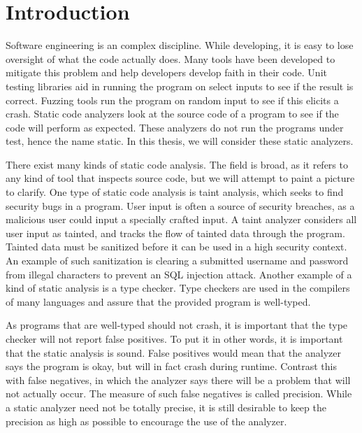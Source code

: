 \chapter{Introduction}
Software engineering is an complex discipline. While developing, it
is easy to lose oversight of what the code actually does. 
Many tools have been developed to mitigate this problem and help developers
develop faith in their code.
Unit testing libraries aid in running the program on select inputs to see 
if the result is correct. Fuzzing tools run the
program on random input to see if this elicits a crash. 
Static code analyzers look at the source code of a program to see if
the code will perform as expected. These analyzers do not run the programs under
test, hence the name static. In this thesis, we will consider these static
analyzers.

There exist many kinds of static code analysis. The field is broad, as it
refers to any kind of tool that inspects source code, but we will attempt to
paint a picture to clarify. One type of static code analysis is taint analysis,
which seeks to find security bugs in a program. User input is often a source of
security breaches, as a malicious user could input a specially crafted input. A
taint analyzer considers all user input as tainted, and tracks the flow of
tainted data through the program. Tainted data must be sanitized before it
can be used in a high security context. An example of such sanitization is
clearing a submitted username and password from illegal characters to prevent
an SQL injection attack. Another example of a kind of static analysis is a 
type checker. Type checkers are used in the compilers of many languages and 
assure that the provided program is well-typed. 

As programs that are well-typed should not crash, it is important
that the type checker will not report false positives. To put it in other 
words, it is important that the static analysis is sound. False positives would
mean that the analyzer says the program is okay, but will in fact crash during
runtime. Contrast this with false negatives, in which the analyzer says there
will be a problem that will not actually occur. The measure of such false
negatives is called precision. While a static analyzer need not be totally
precise, it is still desirable to keep the precision as high as possible to
encourage the use of the analyzer.

